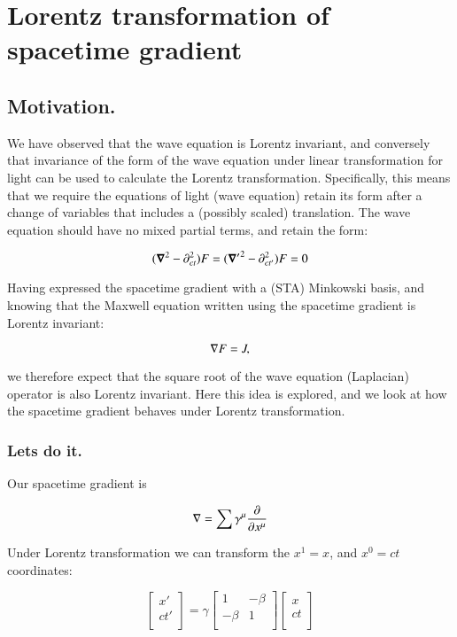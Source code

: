 \chapter{Lorentz transformation of spacetime gradient}
\date{July 16, 2008}

\section{Motivation. }

We have observed that the wave equation is Lorentz invariant, and conversely that invariance of the form of the wave equation under linear transformation for light can be used to calculate the Lorentz transformation.  Specifically, this means that we require the equations of light (wave equation) retain its form after a change of variables that includes
a (possibly scaled) translation.  The wave equation should have no mixed partial terms, and retain the form:

\begin{equation*}
(\boldsymbol{\nabla}^2 - \partial_{ct}^2) F = ({\boldsymbol{\nabla}'}^2 - \partial_{ct'}^2) F = 0
\end{equation*}

Having expressed the spacetime gradient with a (STA) Minkowski basis, and knowing that the Maxwell equation written using the spacetime gradient is Lorentz invariant:

\begin{equation*}
\nabla F = J,
\end{equation*}

we therefore expect that the square root of the wave equation (Laplacian) operator is also Lorentz invariant.  Here this idea is explored, and we look at how the spacetime
gradient behaves under Lorentz transformation.

\subsection{Lets do it. }

Our spacetime gradient is

\begin{equation*}
\nabla = \sum \gamma^{\mu} \frac{\partial}{\partial x^{\mu}}
\end{equation*}

Under Lorentz transformation we can transform the $x^1=x$, and $x^0 = ct$ coordinates:

\begin{equation*}
\begin{bmatrix}
x' \\
ct' \\
\end{bmatrix}
=
\gamma
\begin{bmatrix}
1 & -\beta \\
-\beta & 1 \\
\end{bmatrix}
\begin{bmatrix}
x \\
ct \\
\end{bmatrix}
\end{equation*}

